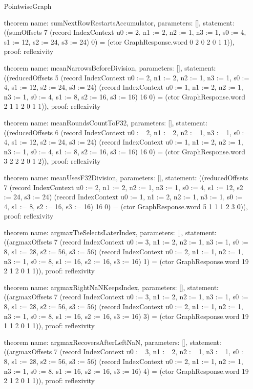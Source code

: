 \begin{lexlean}{PointwiseGraph}
\begin{semanticmodule}
theorem{
  name: sumNextRowRestartsAccumulator,
  parameters: [],
  statement: ((sumOffsets 7 (record IndexContext {u0 := 2, n1 := 2, n2 := 1, n3 := 1, s0 := 4, s1 := 12, s2 := 24, s3 := 24}) 0) = (ctor GraphResponse.word 0 2 0 2 0 1 1)),
  proof: reflexivity{}
}

theorem{
  name: meanNarrowsBeforeDivision,
  parameters: [],
  statement: ((reducedOffsets 5 (record IndexContext {u0 := 2, n1 := 2, n2 := 1, n3 := 1, s0 := 4, s1 := 12, s2 := 24, s3 := 24}) (record IndexContext {u0 := 1, n1 := 2, n2 := 1, n3 := 1, s0 := 4, s1 := 8, s2 := 16, s3 := 16}) 16 0) = (ctor GraphResponse.word 2 1 1 2 0 1 1)),
  proof: reflexivity{}
}

theorem{
  name: meanRoundsCountToF32,
  parameters: [],
  statement: ((reducedOffsets 6 (record IndexContext {u0 := 2, n1 := 2, n2 := 1, n3 := 1, s0 := 4, s1 := 12, s2 := 24, s3 := 24}) (record IndexContext {u0 := 1, n1 := 2, n2 := 1, n3 := 1, s0 := 4, s1 := 8, s2 := 16, s3 := 16}) 16 0) = (ctor GraphResponse.word 3 2 2 2 0 1 2)),
  proof: reflexivity{}
}

theorem{
  name: meanUsesF32Division,
  parameters: [],
  statement: ((reducedOffsets 7 (record IndexContext {u0 := 2, n1 := 2, n2 := 1, n3 := 1, s0 := 4, s1 := 12, s2 := 24, s3 := 24}) (record IndexContext {u0 := 1, n1 := 2, n2 := 1, n3 := 1, s0 := 4, s1 := 8, s2 := 16, s3 := 16}) 16 0) = (ctor GraphResponse.word 5 1 1 1 2 3 0)),
  proof: reflexivity{}
}

theorem{
  name: argmaxTieSelectsLaterIndex,
  parameters: [],
  statement: ((argmaxOffsets 7 (record IndexContext {u0 := 3, n1 := 2, n2 := 1, n3 := 1, s0 := 8, s1 := 28, s2 := 56, s3 := 56}) (record IndexContext {u0 := 2, n1 := 1, n2 := 1, n3 := 1, s0 := 8, s1 := 16, s2 := 16, s3 := 16}) 1) = (ctor GraphResponse.word 19 2 1 2 0 1 1)),
  proof: reflexivity{}
}

theorem{
  name: argmaxRightNaNKeepsIndex,
  parameters: [],
  statement: ((argmaxOffsets 7 (record IndexContext {u0 := 3, n1 := 2, n2 := 1, n3 := 1, s0 := 8, s1 := 28, s2 := 56, s3 := 56}) (record IndexContext {u0 := 2, n1 := 1, n2 := 1, n3 := 1, s0 := 8, s1 := 16, s2 := 16, s3 := 16}) 3) = (ctor GraphResponse.word 19 1 1 2 0 1 1)),
  proof: reflexivity{}
}

theorem{
  name: argmaxRecoversAfterLeftNaN,
  parameters: [],
  statement: ((argmaxOffsets 7 (record IndexContext {u0 := 3, n1 := 2, n2 := 1, n3 := 1, s0 := 8, s1 := 28, s2 := 56, s3 := 56}) (record IndexContext {u0 := 2, n1 := 1, n2 := 1, n3 := 1, s0 := 8, s1 := 16, s2 := 16, s3 := 16}) 4) = (ctor GraphResponse.word 19 2 1 2 0 1 1)),
  proof: reflexivity{}
}


\end{semanticmodule}
\end{lexlean}
